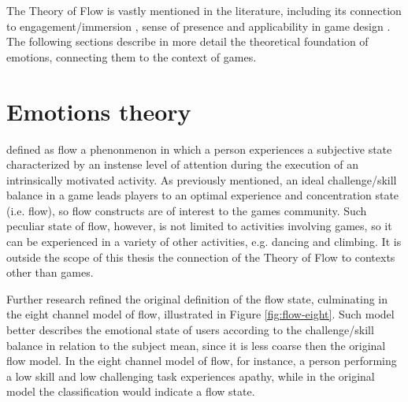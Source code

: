 The Theory of Flow is vastly mentioned in the literature, including its connection to engagement/immersion \parencite{brown2004grounded}, sense of presence \parencite{weibel2011immersion} and applicability in game design \parencite{cruz2017player, sweetser2005gameflow}. The following sections describe in more detail the theoretical foundation of emotions, connecting them to the context of games.

\section{Emotions theory}

\textcite{csikszentmihalyi1991flow} defined as flow a phenonmenon in which a person experiences a subjective state characterized by an instense level of attention during the execution of an intrinsically motivated activity. As previously mentioned, an ideal challenge/skill balance in a game leads players to an optimal experience and concentration state (i.e. flow), so flow constructs are of interest to the games community. Such peculiar state of flow, however, is not limited to activities involving games, so it can be experienced in a variety of other activities, e.g. dancing and climbing. It is outside the scope of this thesis the connection of the Theory of Flow to contexts other than games.

Further research \parencite{nakamura2014concept} refined the original definition of the flow state, culminating in the eight channel model of flow, illustrated in Figure \ref{fig:flow-eight}. Such model better describes the emotional state of users according to the challenge/skill balance in relation to the subject mean, since it is less coarse then the original flow model. In the eight channel model of flow, for instance, a person performing a low skill and low challenging task experiences apathy, while in the original model the classification would indicate a flow state.

